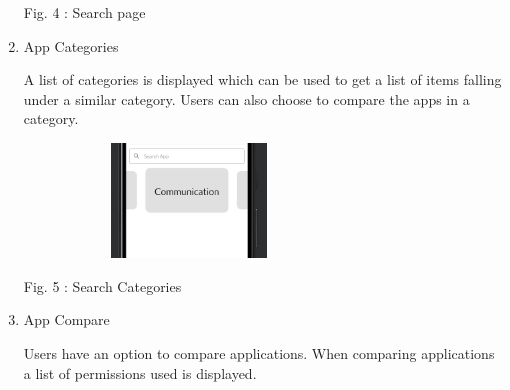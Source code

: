 \documentclass[12pt]{report}
\renewcommand{\_}{\kern-1.5pt\textunderscore\kern-1.5pt}
\begin{document}
\begin{multicols}{2}
\begin{enumerate}


\vspace{\baselineskip}
\vspace{\baselineskip}
\begin{Center}
{\fontsize{10pt}{12.0pt}\selectfont Fig. 4 : Search page}
\end{Center}

\vspace{\baselineskip}
	\item {\fontsize{10pt}{12.0pt}\selectfont App Categories}
\begin{justify}
{\fontsize{10pt}{12.0pt}\selectfont A list of categories is displayed which can be used to get a list of items falling under a similar category. Users can also choose to compare the apps in a category.\par}
\end{justify}

\vspace{\baselineskip}



\begin{figure}[H]
	\begin{Center}
		\includegraphics[width=2.61in,height=1.2in]{./media/image7.png}
	\end{Center}
\end{figure}




\vspace{\baselineskip}\begin{Center}
{\fontsize{10pt}{12.0pt}\selectfont Fig. 5 : Search Categories}
\end{Center}

\vspace{\baselineskip}
	\item {\fontsize{10pt}{12.0pt}\selectfont App Compare}
\begin{justify}
{\fontsize{10pt}{12.0pt}\selectfont Users have an option to compare applications. When comparing applications a list of permissions used is displayed.\par}
\end{justify}


\end{enumerate}
\end{multicols}
\end{document}

